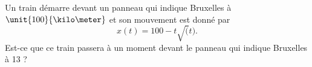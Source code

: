 

\begin{exercice}\label{exo210}

Un train démarre devant un panneau qui indique Bruxelles à $\unit{100}{\kilo\meter}$ et son mouvement est donné par
\[ 
  x(t)=100-t\sqrt(t).
\]
Est-ce que ce train passera à un moment devant le panneau qui indique Bruxelles à \unit{13}{\kilo\meter} ?

\end{exercice}
